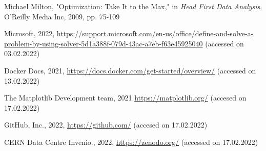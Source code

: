 \documentclass{article}
\begin{document}
\begin{multicols}{2}
\begin{thebibliography}{9}
  Michael Milton, "Optimization: Take It to the Max," in  \textit{Head First Data Analysis}, O'Reilly Media Inc, 2009, pp. 75-109
 
  Microsoft, 2022, \url{https://support.microsoft.com/en-us/office/define-and-solve-a-problem-by-using-solver-5d1a388f-079d-43ac-a7eb-f63e45925040} (accessed on 03.02.2022)

  Docker Docs, 2021, \url{https://docs.docker.com/get-started/overview/} (accessed on 13.02.2022)
 
  The Matplotlib Development team, 2021 \url{https://matplotlib.org/} (accesed on 17.02.2022)
 
  GitHub, Inc., 2022, \url{https://github.com/} (accesed on 17.02.2022)
 
 CERN Data Centre Invenio., 2022, \url{https://zenodo.org/} (accessed on 17.02.2022)
 
\end{thebibliography}
\end{multicols}
\end{document}
